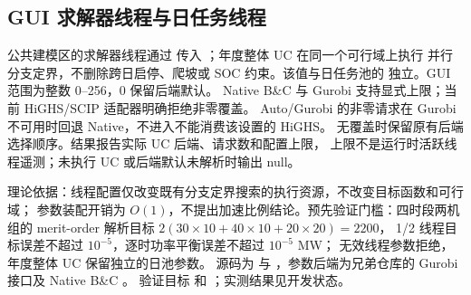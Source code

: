 \subsection{GUI 求解器线程与日任务线程}
公共建模区的求解器线程通过  传入
；年度整体 UC 在同一个可行域上执行
并行分支定界，不删除跨日启停、爬坡或 SOC 约束。该值与日任务池的
 独立。GUI 范围为整数 0--256，0 保留后端默认。
Native B\&C 与 Gurobi 支持显式上限；当前 HiGHS/SCIP 适配器明确拒绝非零覆盖。
Auto/Gurobi 的非零请求在 Gurobi 不可用时回退 Native，不进入不能消费该设置的 HiGHS。
无覆盖时保留原有后端选择顺序。结果报告实际 UC 后端、请求数和配置上限，
上限不是运行时活跃线程遥测；未执行 UC 或后端默认未解析时输出 null。

理论依据：线程配置仅改变既有分支定界搜索的执行资源，不改变目标函数和可行域；
参数装配开销为 $O(1)$，不提出加速比例结论。预先验证门槛：四时段两机组的
merit-order 解析目标 $2(30\times10+40\times10+20\times20)=2200$，
1/2 线程目标误差不超过 $10^{-5}$，逐时功率平衡误差不超过 $10^{-5}$ MW；
无效线程参数拒绝，年度整体 UC 保留独立的日池参数。
源码为  与
，参数后端为兄弟仓库的
Gurobi  接口及 Native B\&C 。
验证目标  和
；实测结果见开发状态。
